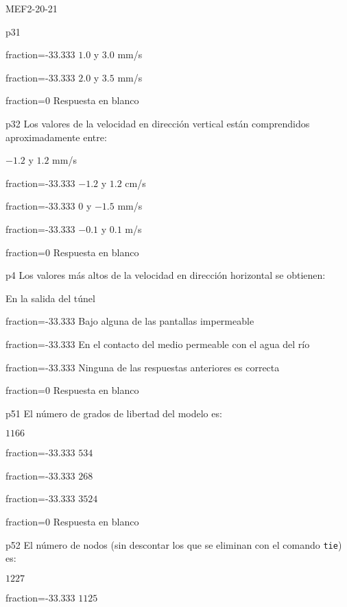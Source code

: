 \documentclass[a4paper]{article}
\begin{document}
\begin{quiz}{MEF2-20-21}
\begin{multi}{p31}
\item[fraction=-33.333] $1.0$ y $3.0$ mm/s
\item[fraction=-33.333] $2.0$ y $3.5$ mm/s
\item[fraction=0] Respuesta en blanco
\end{multi}
\begin{multi}{p32}
Los valores de la velocidad en direcci\'on vertical est\'an
comprendidos aproximadamente entre:
\item* $-1.2$ y $1.2$ mm/s
\item[fraction=-33.333] $-1.2$ y $1.2$ cm/s
\item[fraction=-33.333] $0$ y $-1.5$ mm/s
\item[fraction=-33.333] $-0.1$ y $0.1$ m/s
\item[fraction=0] Respuesta en blanco
\end{multi}
\begin{multi}{p4}
Los valores m\'as altos de la velocidad en direcci\'on horizontal
se obtienen:
\item* En la salida del t\'unel
\item[fraction=-33.333] Bajo alguna de las pantallas impermeable
\item[fraction=-33.333] En el contacto del medio permeable con el agua del r\'io
\item[fraction=-33.333] Ninguna de las respuestas anteriores es correcta
\item[fraction=0] Respuesta en blanco
\end{multi}
\begin{multi}{p51}
El n\'umero de grados de libertad del modelo es:
\item* $1166$
\item[fraction=-33.333] $534$
\item[fraction=-33.333] $268$
\item[fraction=-33.333] $3524$
\item[fraction=0] Respuesta en blanco
\end{multi}
\begin{multi}{p52}
	El n\'umero de nodos (sin descontar los que se eliminan con el comando
	{\tt tie}) es:
\item* $1227$
\item[fraction=-33.333] $1125$

\end{multi}
\end{quiz}
\end{document}
